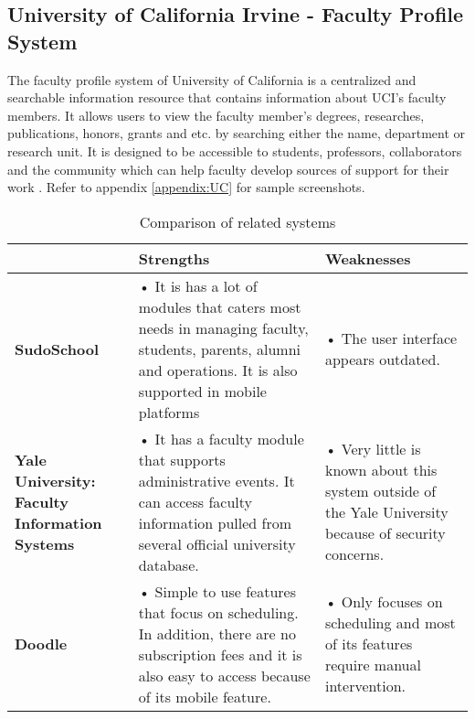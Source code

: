 \subsection{University of California Irvine - Faculty Profile System}
The faculty profile system of University of California is a centralized and searchable information resource that contains information about UCI's faculty members. It allows users to view the faculty member's degrees, researches, publications, honors, grants and etc. by searching either the name, department or research unit. It is designed to be accessible to students, professors, collaborators and the community which can help faculty develop sources of support for their work \cite{ref:FacultyProfileSystemUcIrvine}. Refer to appendix \ref{appendix:UC} for sample screenshots.

\begin{table}
\centering
\caption{Comparison of related systems}
\begin{tabular}{p{1.5in} | p{2in} | p{2in}}
\hline
& \textbf{Strengths}& \textbf{Weaknesses}                                                                                                                                                                                                                          \\ \hline

\textbf{SudoSchool} & 
• It is has a lot of modules that caters most needs in managing faculty, students, parents, alumni and operations. It is also supported in mobile platforms & 
• The user interface appears outdated.                \\ 

\hline
\textbf{Yale University: Faculty Information Systems}                  & 
• It has a faculty module that supports administrative events. It can access faculty information pulled from several official university database.                                                                                                                      & • Very little is known about this system outside of the Yale University because of security concerns. \\
\hline
\textbf{Doodle}  & 
• Simple to use features that focus on scheduling. In addition, there are no subscription fees and it is also easy to access because of its mobile feature.                                                                                                    & • Only focuses on scheduling and most of its features require manual intervention. \\
\hline


\end{tabular}
\end{table}
